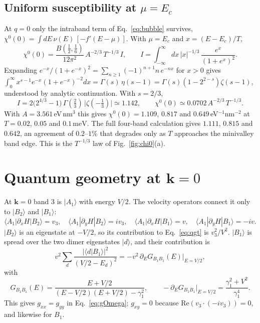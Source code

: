 \documentclass[12pt,a4paper]{article}
\newcommand{\bk}{\mathbf{k}}
\newcommand{\meV}{\,\mathrm{meV}}
\begin{document}
\subsection{Uniform susceptibility at $\mu=E_c$}

At $q=0$ only the intraband term of Eq.~\eqref{eq:bubble} survives, $\chi^0(0)=\int dE\,\nu(E)\,[-f'(E-\mu)]$. With $\mu=E_c$ and $x=(E-E_c)/T$,
\begin{equation}
\chi^0(0)=\frac{B(\tfrac12,\tfrac16)}{12\pi^2}\,A^{-2/3}\,T^{-1/3}\,I,\qquad
I=\int_{-\infty}^{\infty}\!dx\,|x|^{-1/3}\,\frac{e^x}{(1+e^x)^2}.
\end{equation}
Expanding $e^{-x}/(1+e^{-x})^2=\sum_{n\ge1}(-1)^{n+1}n\,e^{-nx}$ for $x>0$ gives $\int_0^\infty x^{s-1}e^{-x}(1+e^{-x})^{-2}dx=\Gamma(s)\,\eta(s-1)=\Gamma(s)(1-2^{2-s})\zeta(s-1)$, understood by analytic continuation. With $s=2/3$,
\begin{equation}
I=2\big(2^{4/3}-1\big)\,\Gamma(\tfrac23)\,\big|\zeta(-\tfrac13)\big|\simeq1.142,\qquad
\chi^0(0)\simeq0.0702\,A^{-2/3}\,T^{-1/3}.
\end{equation}
With $A=3.561\,$eV\,nm$^3$ this gives $\chi^0(0)=1.109$, $0.817$ and $0.649\,$eV$^{-1}$nm$^{-2}$ at $T=0.02$, $0.05$ and $0.1\meV$. The full four-band calculation gives $1.111$, $0.815$ and $0.642$, an agreement of $0.2$--$1\%$ that degrades only as $T$ approaches the minivalley band edge. This is the $T^{-1/3}$ law of Fig.~\ref{fig:chi0}(a).

\section{Quantum geometry at \texorpdfstring{$\bk=0$}{k = 0}}\label{app:geometry}

At $\bk=0$ band 3 is $|A_1\rangle$ with energy $V/2$. The velocity operators connect it only to $|B_2\rangle$ and $|B_1\rangle$:
\begin{equation}
\langle A_1|\partial_xH|B_2\rangle=v_3,\quad \langle A_1|\partial_yH|B_2\rangle=iv_3,\quad
\langle A_1|\partial_xH|B_1\rangle=v,\quad \langle A_1|\partial_yH|B_1\rangle=-iv .
\end{equation}
$|B_2\rangle$ is an eigenstate at $-V/2$, so its contribution to Eq.~\eqref{eq:qgt} is $v_3^2/V^2$. $|B_1\rangle$ is spread over the two dimer eigenstates $|d\rangle$, and their contribution is
\begin{equation}
v^2\sum_d\frac{|\langle d|B_1\rangle|^2}{(V/2-E_d)^2}=-v^2\,\partial_EG_{B_1B_1}(E)\Big|_{E=V/2},
\end{equation}
with
\begin{equation}
G_{B_1B_1}(E)=\frac{E+V/2}{(E-V/2)(E+V/2)-\gamma_1^2},\qquad
-\partial_EG_{B_1B_1}\Big|_{E=V/2}=\frac{\gamma_1^2+V^2}{\gamma_1^4}.
\end{equation}
This gives $g_{xx}=g_{yy}$ in Eq.~\eqref{eq:gOmega}; $g_{xy}=0$ because $\mathrm{Re}(v_3\cdot(-iv_3))=0$, and likewise for $B_1$.
\end{document}
